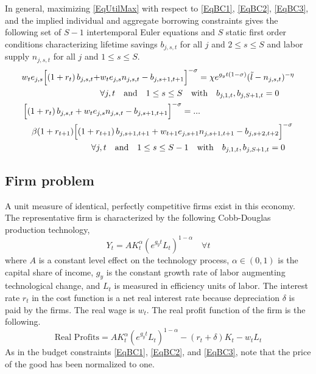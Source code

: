 \documentclass[letterpaper,12pt]{article}
\theoremstyle{definition}
\begin{document}
\begin{spacing}{1.5}
    In general, maximizing \eqref{EqUtilMax} with respect to \eqref{EqBC1}, \eqref{EqBC2}, \eqref{EqBC3}, and the implied individual and aggregate borrowing constraints gives the following set of $S-1$ intertemporal Euler equations and $S$ static first order conditions characterizing lifetime savings $b_{j,s,t}$ for all $j$ and $2\leq s\leq S$ and labor supply $n_{j,s,t}$ for all $j$ and $1\leq s\leq S$.
    \begin{gather}
      \begin{split}
        w_t e_{j,s}\Bigl[\left(1+r_t\right)b_{j,s,t} + &w_t e_{j,s}n_{j,s,t} - b_{j,s+1,t+1}\Bigr]^{-\sigma} = \chi e^{g_y t(1-\sigma)}(\tilde{l} - n_{j,s,t})^{-\eta} \\
        &\forall j,t \quad\text{and}\quad 1\leq s\leq S \quad\text{with}\quad b_{j,1,t},b_{j,S+1,t}=0
      \end{split} \label{EqEulerLabGen} \\
      \begin{split}
        &\Bigl[\left(1+r_t\right)b_{j,s,t} + w_t e_{j,s}n_{j,s,t} - b_{j,s+1,t+1}\Bigr]^{-\sigma} = ... \\
        &\quad \beta(1+r_{t+1})\Bigl[\left(1+r_{t+1}\right)b_{j,s+1,t+1} + w_{t+1} e_{j,s+1}n_{j,s+1,t+1} - b_{j,s+2,t+2}\Bigr]^{-\sigma} \\
        &\quad\quad\quad\quad\quad\quad\quad\quad\forall j,t \quad\text{and}\quad 1\leq s\leq S-1 \quad\text{with}\quad b_{j,1,t},b_{j,S+1,t}=0
      \end{split} \label{EqEulerSavGen}
    \end{gather}


  \subsection{Firm problem}\label{SecFirms}

    A unit measure of identical, perfectly competitive firms exist in this economy. The representative firm is characterized by the following Cobb-Douglas production technology,
    \begin{equation}\label{EqCobbDougProd}
       Y_t = A K_t^\alpha\left(e^{g_y t}L_t\right)^{1-\alpha} \quad \forall t
    \end{equation}
    where $A$ is a constant level effect on the technology process, $\alpha\in(0,1)$ is the capital share of income, $g_y$ is the constant growth rate of labor augmenting technological change, and $L_t$ is measured in efficiency units of labor. The interest rate $r_t$ in the cost function is a net real interest rate because depreciation $\delta$ is paid by the firms. The real wage is $w_t$. The real profit function of the firm is the following.
    \begin{equation}\label{EqFirmProfit}
       \text{Real Profits} = A K_t^\alpha\left(e^{g_y t}L_t\right)^{1-\alpha} - (r_t + \delta)K_t - w_t L_t
    \end{equation}
    As in the budget constraints \eqref{EqBC1}, \eqref{EqBC2}, and \eqref{EqBC3}, note that the price of the good has been normalized to one.


\end{spacing}
\end{document}
